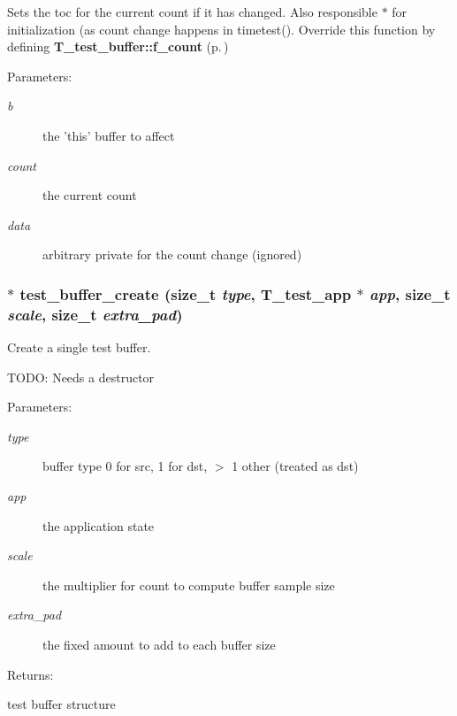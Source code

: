 Sets the toc for the current count if it has changed. Also responsible $\ast$ for initialization (as count change happens in timetest(). Override this function by defining {\bf T\_\-test\_\-buffer::f\_\-count} {\rm (p.\,\pageref{structT__test__buffer_m22})} \begin{Desc}
\item[Parameters: ]\par
\begin{description}
\item[{\em 
b}]the 'this' buffer to affect \item[{\em 
count}]the current count \item[{\em 
data}]arbitrary private for the count change (ignored) \end{description}
\end{Desc}
\subsubsection{$\ast$ test\_\-buffer\_\-create (size\_\-t {\em type}, {\bf T\_\-test\_\-app} $\ast$ {\em app}, size\_\-t {\em scale}, size\_\-t {\em extra\_\-pad})}\label{test__utils_8h_a48}


Create a single test buffer.

TODO: Needs a destructor \begin{Desc}
\item[Parameters: ]\par
\begin{description}
\item[{\em 
type}]buffer type 0 for src, 1 for dst, $>$ 1 other (treated as dst) \item[{\em 
app}]the application state \item[{\em 
scale}]the multiplier for count to compute buffer sample size \item[{\em 
extra\_\-pad}]the fixed amount to add to each buffer size \end{description}
\end{Desc}
\begin{Desc}
\item[Returns: ]\par
test buffer structure \end{Desc}
